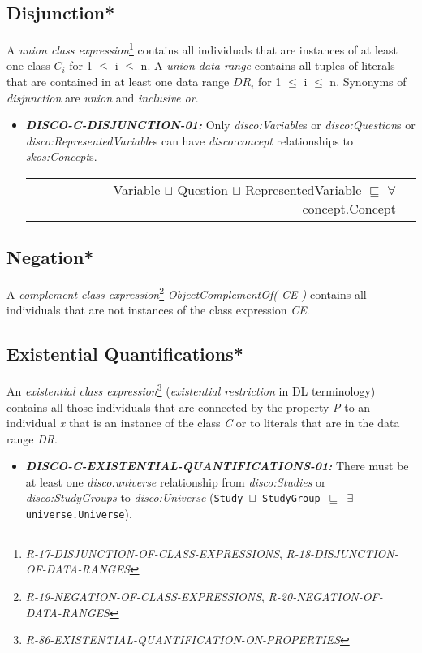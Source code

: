 \documentclass{llncs}
\newcommand{\ms}[1]{\texttt{#1}}
\newenvironment{DL}{
  \vspace{0cm}
  \begin{tabular}{r l}

}{
  \end{tabular}
}
\begin{document}
\subsection{Disjunction*}

A \emph{union class expression}\footnote{{\em R-17-DISJUNCTION-OF-CLASS-EXPRESSIONS}, {\em R-18-DISJUNCTION-OF-DATA-RANGES}} contains all individuals that are instances of at least one class $C_{i}$ for 1 $\leq$ i $\leq$ n. 
A \emph{union data range} contains all tuples of literals that are contained in at least one data range $DR_{i}$ for 1 $\leq$ i $\leq$ n.
Synonyms of {\em disjunction} are {\em union} and {\em inclusive or}.

\begin{itemize}
	\item \textbf{{\em DISCO-C-DISJUNCTION-01:}} 
Only {\em disco:Variable}s or {\em disco:Question}s or {\em disco:RepresentedVariable}s can have {\em disco:concept} relationships to {\em skos:Concept}s.

\begin{DL}
Variable $\sqcup$ Question $\sqcup$ RepresentedVariable $\sqsubseteq$ $\forall$ concept.Concept \\
\end{DL}
\end{itemize}

\subsection{Negation*}

A \emph{complement class expression}\footnote{\emph{R-19-NEGATION-OF-CLASS-EXPRESSIONS}, \emph{R-20-NEGATION-OF-DATA-RANGES}} \emph{ObjectComplementOf( CE )} contains all individuals that are not instances of the class expression \emph{CE}. 

\subsection{Existential Quantifications*}

An \emph{existential class expression}\footnote{{\em R-86-EXISTENTIAL-QUANTIFICATION-ON-PROPERTIES}} ({\em existential restriction} in DL terminology) contains all those individuals that are connected by the property \emph{P} to an individual \emph{x} that is an instance of the class \emph{C} or to literals that are in the data range \emph{DR}.

\begin{itemize}
	\item \textbf{{\em DISCO-C-EXISTENTIAL-QUANTIFICATIONS-01:}} 
There must be at least one {\em disco:universe} relationship from {\em disco:Studies} or {\em disco:StudyGroups} to {\em disco:Universe} (\ms{Study $\sqcup$ StudyGroup $\sqsubseteq$ $\exists$ universe.Universe}).
\end{itemize}
\end{document}
